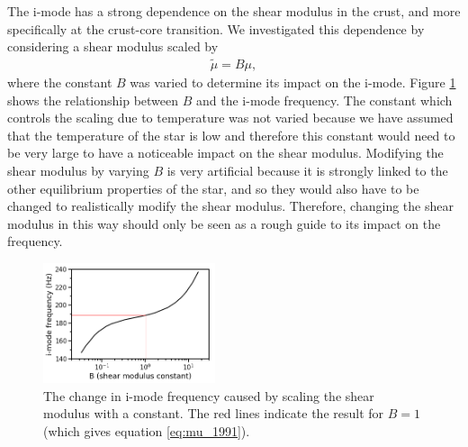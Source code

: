 \documentclass[fleqn,usenatbib]{mnras}
\begin{document}
\hspace{\parindent}The i-mode has a strong dependence on the shear modulus in the crust, and more specifically at the crust-core transition. We investigated this dependence by considering a shear modulus scaled by 
\begin{align}
\tilde{\mu} = B \mu,
\end{align}
\noindent where the constant $B$ was varied to determine its impact on the i-mode. Figure \ref{fig:mu_B} shows the relationship between $B$ and the i-mode frequency. The constant which controls the scaling due to temperature was not varied because we have assumed that the temperature of the star is low and therefore this constant would need to be very large to have a noticeable impact on the shear modulus. Modifying the shear modulus by varying $B$ is very artificial because it is strongly linked to the other equilibrium properties of the star, and so they would also have to be changed to realistically modify the shear modulus. Therefore, changing the shear modulus in this way should only be seen as a rough guide to its impact on the frequency.

\begin{figure}
\centering
\includegraphics[width=0.45\textwidth,angle=0]{B_vs_f.png}
\caption{The change in i-mode frequency caused by scaling the shear modulus with a constant. The red lines indicate the result for $B=1$ (which gives equation \ref{eq:mu_1991}).}
\label{fig:mu_B}
\end{figure}
\end{document}
